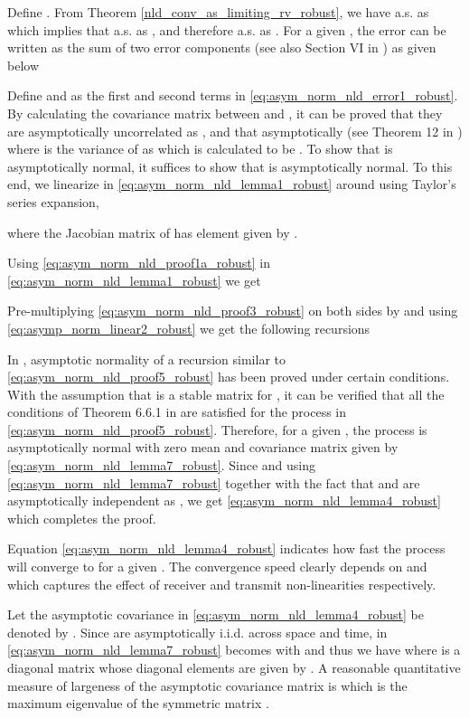 \documentclass[onecolumn, draft, 12pt]{IEEEtran}
\begin{document}
\begin{IEEEproof}
Define . From Theorem \ref{nld_conv_as_limiting_rv_robust}, we have   a.s. as  which implies that  a.s. as , and therefore  a.s. as . For a given , the error  can be written as the sum of two error components (see also Section VI in \cite{MinyiHuang2008}) as given below

Define  and  as the first and second terms in \eqref{eq:asym_norm_nld_error1_robust}. By calculating the covariance matrix between  and , it can be proved that they are asymptotically uncorrelated as , and that asymptotically  (see Theorem 12 in \cite{MinyiHuang2008}) where  is the variance of  as  which is calculated to be . To show that  is asymptotically normal, it suffices to show that   is asymptotically normal. To this end, we linearize  in \eqref{eq:asym_norm_nld_lemma1_robust} around  using Taylor's series expansion,


where the Jacobian matrix of  has  element given by 
.

Using \eqref{eq:asym_norm_nld_proof1a_robust} in \eqref{eq:asym_norm_nld_lemma1_robust} we get

Pre-multiplying \eqref{eq:asym_norm_nld_proof3_robust} on both sides by  and using \eqref{eq:asymp_norm_linear2_robust} we get the following recursions 

In \cite{Nevelson1973}, asymptotic normality  of a recursion similar to \eqref{eq:asym_norm_nld_proof5_robust} has been proved  under certain conditions. With the assumption that  is a stable matrix for , it can be verified that all the conditions of Theorem 6.6.1 in \cite[p. 147]{Nevelson1973} are satisfied for the process  in \eqref{eq:asym_norm_nld_proof5_robust}. Therefore, for a given , the process  is asymptotically normal with zero mean and covariance matrix given by \eqref{eq:asym_norm_nld_lemma7_robust}. Since  and using \eqref{eq:asym_norm_nld_lemma7_robust} together with the fact that  and  are asymptotically independent as , we get \eqref{eq:asym_norm_nld_lemma4_robust} which completes the proof.
\end{IEEEproof}

Equation \eqref{eq:asym_norm_nld_lemma4_robust} indicates how fast the process  will converge to  for a given . The convergence speed clearly depends on  and  which captures the effect of receiver and transmit non-linearities respectively. 

Let the asymptotic covariance in \eqref{eq:asym_norm_nld_lemma4_robust} be denoted by . Since  are asymptotically i.i.d. across space and time,  in \eqref{eq:asym_norm_nld_lemma7_robust} becomes  with  and thus we have  where  is a diagonal matrix whose diagonal elements are given by . A reasonable quantitative measure of largeness \cite{Polyak1981} of the asymptotic covariance matrix is   which is the maximum eigenvalue of the symmetric matrix . 
\end{document}
